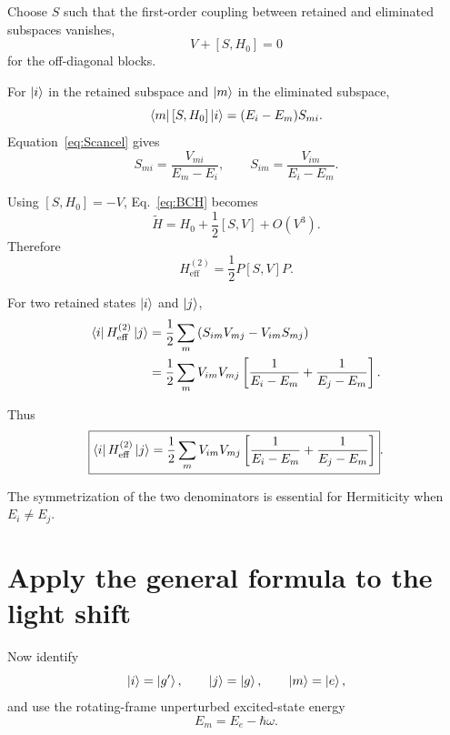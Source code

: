 \documentclass[11pt]{article}
\newcommand{\projG}{P}
\begin{document}
Choose $S$ such that the first-order coupling between retained and eliminated subspaces vanishes,
\begin{equation}
V+[S,H_0]=0
\label{eq:Scancel}
\end{equation}
for the off-diagonal blocks.

For $\ket{i}$ in the retained subspace and $\ket{m}$ in the eliminated subspace,
\begin{equation}
\bra{m}[S,H_0]\ket{i}
=
(E_i-E_m)S_{mi}.
\label{eq:commmatrix}
\end{equation}
Equation~\eqref{eq:Scancel} gives
\begin{equation}
S_{mi}
=
\frac{V_{mi}}{E_m-E_i},
\qquad
S_{im}
=
\frac{V_{im}}{E_i-E_m}.
\label{eq:Smatrix}
\end{equation}

Using $[S,H_0]=-V$, Eq.~\eqref{eq:BCH} becomes
\begin{equation}
\widetilde H
=
H_0+\frac{1}{2}[S,V]+O(V^3).
\label{eq:Htilde2}
\end{equation}
Therefore
\begin{equation}
H_{\mathrm{eff}}^{(2)}
=
\frac{1}{2}\projG[S,V]\projG.
\label{eq:Heff2operator}
\end{equation}

For two retained states $\ket{i}$ and $\ket{j}$,
\begin{align}
\bra{i}H_{\mathrm{eff}}^{(2)}\ket{j}
&=
\frac{1}{2}
\sum_m
\left(
S_{im}V_{mj}-V_{im}S_{mj}
\right)
\nonumber\\
&=
\frac{1}{2}
\sum_m
V_{im}V_{mj}
\left[
\frac{1}{E_i-E_m}
+
\frac{1}{E_j-E_m}
\right].
\label{eq:generalHeff2}
\end{align}

Thus
\begin{equation}
\boxed{
\bra{i}H_{\mathrm{eff}}^{(2)}\ket{j}
=
\frac{1}{2}
\sum_m
V_{im}V_{mj}
\left[
\frac{1}{E_i-E_m}
+
\frac{1}{E_j-E_m}
\right]
}.
\label{eq:generalboxed}
\end{equation}

The symmetrization of the two denominators is essential for Hermiticity when $E_i\neq E_j$.

\section{Apply the general formula to the light shift}

Now identify
\begin{equation}
\ket{i}=\ket{g'},
\qquad
\ket{j}=\ket{g},
\qquad
\ket{m}=\ket{e},
\label{eq:identification}
\end{equation}
and use the rotating-frame unperturbed excited-state energy
\begin{equation}
E_m=E_e-\hbar\omega.
\label{eq:Emrot}
\end{equation}
\end{document}
